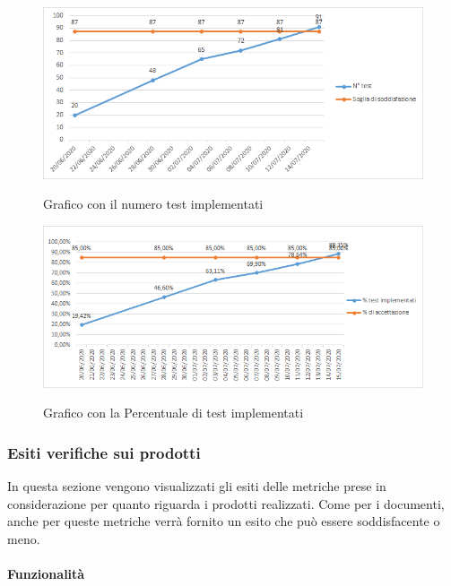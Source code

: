 \begin{figure}[H]
  \centering
  \includegraphics[width=12cm]{img/testImplRa.png}
  \label{fig:test_implementati}
  \caption{Grafico con il numero test implementati}
\end{figure}

\begin{figure}[H]
  \centering
  \includegraphics[width=12cm]{img/percentTestImplRa.png}
  \label{fig:test_implementati}
  \caption{Grafico con la Percentuale di test implementati}
\end{figure}

\subsubsection{Esiti verifiche sui prodotti}

\label{sub:esiti_verifiche_sui_prodotti}
In questa sezione vengono visualizzati gli esiti delle metriche prese in considerazione per quanto riguarda i prodotti realizzati. Come per i documenti, anche per queste metriche verrà fornito un esito che può essere soddisfacente o meno.

\paragraph{Funzionalità}
\label{sub:funzionalita}


